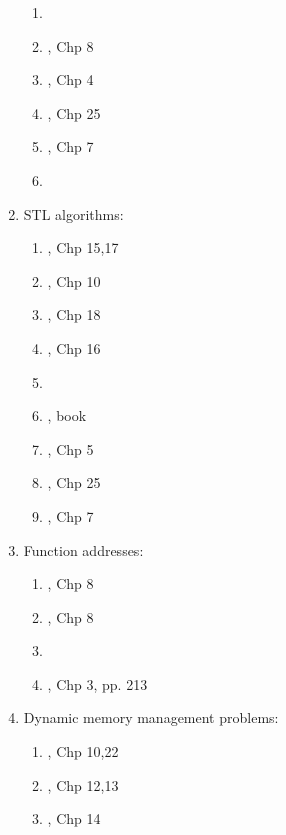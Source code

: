 \begin{enumerate}
\begin{enumerate}
	\item \cite[Chp. 8]{Scheinerman2006}
	\item \cite{Schildt2004a}, Chp 8
	\item \cite{Eckel2003}, Chp 4
	\item \cite{Oualline2003}, Chp 25
	\item \cite{Vermeir2001}, Chp 7
	\item \cite[Chp. 24, pp. 625--691; Chp. 25--38, pp. 695--927]{Schildt1998a}
	\end{enumerate}
\item STL algorithms: \vspace{-0.3cm}
	\begin{enumerate} \itemsep -2pt
	\item \cite{Gregoire2014}, Chp 15,17
	\item \cite{Lippman2013}, Chp 10
	\item \cite{Allain2012}, Chp 18
	\item \cite{Prata2012}, Chp 16
	\item \cite[\S18.3, pp. 977-991]{Savitch2009}
	\item \cite{Reese2006a}, book
	\item \cite{Eckel2003}, Chp 5
	\item \cite{Oualline2003}, Chp 25
	\item \cite{Vermeir2001}, Chp 7
	\end{enumerate}
\item Function addresses: \vspace{-0.3cm}
	\begin{enumerate} \itemsep -2pt
	\item \cite{Stroustrup2014}, Chp 8
	\item \cite{Stroustrup2009}, Chp 8
	\item \cite[pp. 330--331]{Prata2005}
	\item \cite{Eckel2000}, Chp 3, pp. 213
	\end{enumerate}
\item Dynamic memory management problems: \vspace{-0.3cm}
	\begin{enumerate} \itemsep -2pt
	\item \cite{Gregoire2014}, Chp 10,22
	\item \cite{Lippman2013}, Chp 12,13
	\item \cite{Allain2012}, Chp 14

\end{enumerate}
\end{enumerate}
